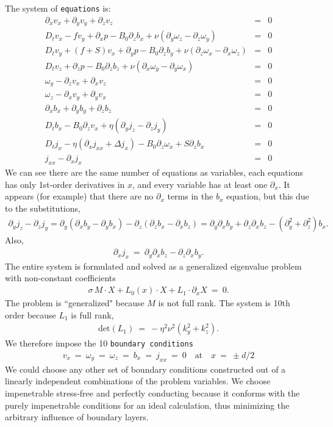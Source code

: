 \documentclass[aps,prl,preprint
,superscriptaddress]{revtex4-1}
\newcommand\Beq{\begin{eqnarray}}
\newcommand\Eeq{\end{eqnarray}}
\newcommand{\pd}[1]{\partial_{#1}}
\begin{document}
The system of \texttt{equations} is:
\Beq\label{u-eq}
\pd{x} v_{x} + \pd{y} v_{y} + \pd{z} v_{z}  &=& 0\\
D_{t} v_{x}  - f v_{y} + \pd{x} p - B_{0} \pd{z} b_{x}  + \nu ( \pd{y} \omega_{z} - \pd{z} \omega_{y}) &=& 0\\
D_{t} v_{y}  + (f+S) v_{x} + \pd{y} p - B_{0} \pd{z} b_{y} + \nu ( \pd{z} \omega_{x} - \pd{x} \omega_{z})&=& 0\label{v-eq} \\
D_{t} v_{z} + \pd{z} p - B_{0} \pd{z} b_{z} + \nu ( \pd{x} \omega_{y} - \pd{y} \omega_{x})&=& 0 \\
\omega_{y} - \pd{z} v_{x} + \pd{x} v_{z} &=& 0 \\
\omega_{z} - \pd{x} v_{y} + \pd{y} v_{x} &=& 0 \\
\pd{x} b_{x} + \pd{y} b_{y} + \pd{z} b_{z}   &=& 0\\
D_{t} b_{x} - B_{0} \pd{z} v_{x} + \eta ( \pd{y} j_{z} - \pd{z} j_{y})&=& 0\\
D_{t} j_{x}  - \eta( \pd{x}j_{xx} +  \Delta j_{x} )  - B_{0} \pd{z} \omega_{x} + S \pd{z} b_{x} &=& 0\\
j_{xx} - \pd{x} j_{x} &=& 0
\Eeq
We can see there are the same number of equations as variables, each equations has only 1st-order derivatives in $x$, and every variable has at least one $\pd{x}$. 
It appears (for example) that there are no $\pd{x}$ terms in the $b_{x}$ equation, but this due to the substitutions, 
\Beq
\pd{y} j_{z} - \pd{z} j_{y} =  \pd{y}(\pd{x} b_{y} - \pd{y} b_{x}) - \pd{z}(\pd{z} b_{x} - \pd{x} b_{z})  =  \pd{y}\pd{x}b_{y} + \pd{z}\pd{x}b_{z} - (\pd{y}^{2} + \pd{z}^{2})b_{x}.
\Eeq
Also,
\Beq
\pd{x}j_{x} \ = \ \pd{y} \pd{x} b_{z} - \pd{z} \pd{x}b_{y}.
\Eeq
The entire system is formulated and solved as a generalized eigenvalue problem with non-constant coefficients 
\Beq
\sigma \, M \cdot X + L_{0}(x) \cdot X + L_{1}\cdot \pd{x} X \ = \ 0.
\Eeq
The problem is ``generalized" because $M$ is not full rank. The system is 10th order because $L_{1}$ is full rank,
\Beq
\text{det}(L_{1}) \ = \ -\eta ^2 \nu ^2 \left(k_y^2+k_z^2\right).
\Eeq
We therefore impose the 10 \texttt{boundary conditions} 
\Beq
v_{x} \ = \ \omega_{y} \ = \ \omega_{z} \ = \ b_{x} \ = \ j_{xx} \ = \ 0 \quad \text{at} \quad x \ = \ \pm d/2
\Eeq
We could choose any other set of boundary conditions constructed out of a linearly independent combinations of the problem variables. 
We choose impenetrable stress-free and perfectly conducting because it conforms with the purely impenetrable conditions for an ideal calculation, thus minimizing the arbitrary influence of boundary layers.
\end{document}
